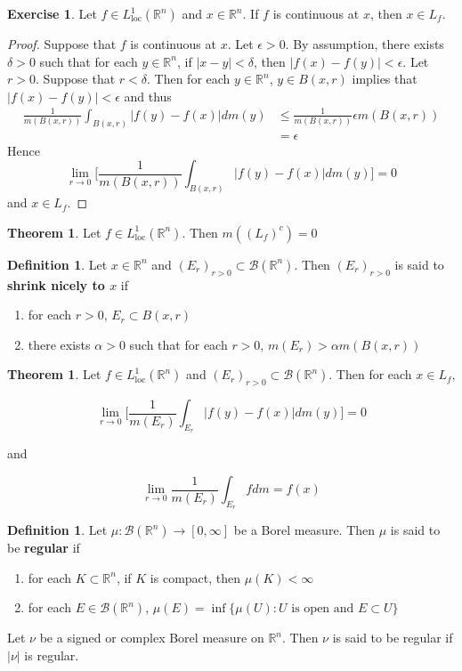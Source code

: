 \documentclass[12pt]{amsart}
\theoremstyle{definition}
\newtheorem{defn}[definition]{Definition}
\newtheorem{thm}[definition]{Theorem}
\newtheorem{ex}[definition]{Exercise}
\newcommand{\al}{\alpha}
\newcommand{\del}{\delta}
\newcommand{\ep}{\epsilon}
\newcommand{\R}{\mathbb{R}}
\newcommand{\MB}{\mathcal{B}}
\newcommand{\RG}{[0,\infty]}
\newcommand{\Ll}{L^1_{\text{loc}}(\R^n)}
\newcommand{\lex}[1]{\label{ex:#1}}
\newcommand{\ld}[1]{\label{defn:#1}}
\begin{document}
	\begin{ex} \lex{00000} 
		Let $f \in \Ll$ and $x \in \R^n$. If $f$ is continuous at $x$, then $x \in L_f$.
	\end{ex}
	
	\begin{proof}
		Suppose that $f$ is continuous at $x$. Let $\ep > 0$. By assumption, there exists $\del >0$ such that for each $y \in \R^n$, if $|x-y|< \del$, then $|f(x)-f(y)| < \ep$. Let $r >0$. Suppose that $r< \del$. Then for each $y \in \R^n$, $y \in B(x,r)$ implies that $|f(x) - f(y)| < \ep$ and thus 
		\begin{align*}
			\frac{1}{m(B(x,r))}\int_{B(x,r)}|f(y) - f(x)|dm(y)
			& \leq \frac{1}{m(B(x,r))} \ep m(B(x,r))\\
			&=\ep
		\end{align*}
		Hence $$\lim_{r \rightarrow 0} \bigg[ \frac{1}{m(B(x,r))}\int_{B(x,r)}|f(y) - f(x)|dm(y)\bigg] =0$$ 
		and $x \in L_f$.
	\end{proof}
	
	\begin{thm}
		Let $f \in \Ll$. Then $m((L_f)^c) = 0$
	\end{thm}
	
	\begin{defn} \ld{00000} 
		Let $x \in \R^n$ and $(E_r)_{r>0} \subset \MB(\R^n)$. Then $(E_r)_{r>0}$ is said to \textbf{shrink nicely to $x$} if 
		
		\begin{enumerate}
			\item for each $r>0$, $E_r \subset B(x,r)$
			\item there exists $\al >0$ such that for each $r>0$, $m(E_r)> \al m(B(x,r))$
		\end{enumerate} 
	\end{defn}
	
	\begin{thm}
		Let $f \in \Ll$ and $(E_r)_{r>0} \subset \MB(\R^n)$. Then for each $x \in L_f$, 
		
		$$\lim_{r \rightarrow 0} \bigg[ \frac{1}{m(E_r)}\int_{E_r}|f(y) - f(x)|dm(y)\bigg] =0$$
		
		and 
		
		$$\lim_{r \rightarrow 0}  \frac{1}{m(E_r)}\int_{E_r}fdm = f(x)$$
	\end{thm}
	
	\begin{defn} \ld{00000} 
		Let $\mu:\MB(\R^n) \rightarrow \RG$ be a Borel measure. Then $\mu$ is said to be \textbf{regular} if 
		\begin{enumerate}
			\item for each $K \subset \R^n$, if $K$ is compact, then $\mu(K)< \infty$
			\item for each $E \in \MB(\R^n)$, $\mu(E) = \inf \{\mu(U): U \text{ is open and }E \subset U\}$
		\end{enumerate}
		
		Let $\nu$ be a signed or complex Borel measure on $\R^n$. Then $\nu$ is said to be regular if $|\nu|$ is regular.
	\end{defn}
	
\end{document}
